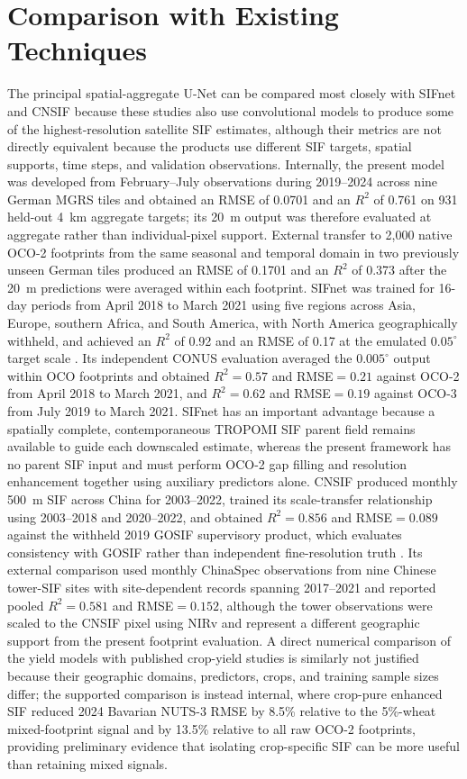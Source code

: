\section{Comparison with Existing Techniques}

The principal spatial-aggregate U-Net can be compared most closely with SIFnet and CNSIF because these studies also use convolutional models to produce some of the highest-resolution satellite SIF estimates, although their metrics are not directly equivalent because the products use different SIF targets, spatial supports, time steps, and validation observations. Internally, the present model was developed from February--July observations during 2019--2024 across nine German MGRS tiles and obtained an RMSE of 0.0701 and an $R^2$ of 0.761 on 931 held-out 4~km aggregate targets; its 20~m output was therefore evaluated at aggregate rather than individual-pixel support. External transfer to 2,000 native OCO-2 footprints from the same seasonal and temporal domain in two previously unseen German tiles produced an RMSE of 0.1701 and an $R^2$ of 0.373 after the 20~m predictions were averaged within each footprint. SIFnet was trained for 16-day periods from April 2018 to March 2021 using five regions across Asia, Europe, southern Africa, and South America, with North America geographically withheld, and achieved an $R^2$ of 0.92 and an RMSE of 0.17 at the emulated $0.05^{\circ}$ target scale \cite{gensheimer2022convolutional}. Its independent CONUS evaluation averaged the $0.005^{\circ}$ output within OCO footprints and obtained $R^2=0.57$ and RMSE${}=0.21$ against OCO-2 from April 2018 to March 2021, and $R^2=0.62$ and RMSE${}=0.19$ against OCO-3 from July 2019 to March 2021. SIFnet has an important advantage because a spatially complete, contemporaneous TROPOMI SIF parent field remains available to guide each downscaled estimate, whereas the present framework has no parent SIF input and must perform OCO-2 gap filling and resolution enhancement together using auxiliary predictors alone. CNSIF produced monthly 500~m SIF across China for 2003--2022, trained its scale-transfer relationship using 2003--2018 and 2020--2022, and obtained $R^2=0.856$ and RMSE${}=0.089$ against the withheld 2019 GOSIF supervisory product, which evaluates consistency with GOSIF rather than independent fine-resolution truth \cite{du2025cnsif}. Its external comparison used monthly ChinaSpec observations from nine Chinese tower-SIF sites with site-dependent records spanning 2017--2021 and reported pooled $R^2=0.581$ and RMSE${}=0.152$, although the tower observations were scaled to the CNSIF pixel using NIRv and represent a different geographic support from the present footprint evaluation. A direct numerical comparison of the yield models with published crop-yield studies is similarly not justified because their geographic domains, predictors, crops, and training sample sizes differ; the supported comparison is instead internal, where crop-pure enhanced SIF reduced 2024 Bavarian NUTS-3 RMSE by 8.5\% relative to the 5\%-wheat mixed-footprint signal and by 13.5\% relative to all raw OCO-2 footprints, providing preliminary evidence that isolating crop-specific SIF can be more useful than retaining mixed signals.
